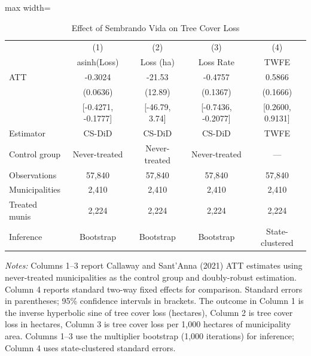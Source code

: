 \begin{table}[htbp]
\centering
\caption{Effect of Sembrando Vida on Tree Cover Loss}
\label{tab:main_results}
\begin{adjustbox}{max width=\textwidth}
\begin{tabular}{lcccc}
\toprule
 & (1) & (2) & (3) & (4) \\
 & asinh(Loss) & Loss (ha) & Loss Rate & TWFE \\
\midrule
ATT & -0.3024 & -21.53 & -0.4757 & 0.5866 \\
 & (0.0636) & (12.89) & (0.1367) & (0.1666) \\
 & [-0.4271, -0.1777] & [-46.79, 3.74] & [-0.7436, -0.2077] & [0.2600, 0.9131] \\
\midrule
Estimator & CS-DiD & CS-DiD & CS-DiD & TWFE \\
Control group & Never-treated & Never-treated & Never-treated & --- \\
Observations & 57,840 & 57,840 & 57,840 & 57,840 \\
Municipalities & 2,410 & 2,410 & 2,410 & 2,410 \\
Treated munis & 2,224 & 2,224 & 2,224 & 2,224 \\
Inference & Bootstrap & Bootstrap & Bootstrap & State-clustered \\
\bottomrule
\end{tabular}
\end{adjustbox}
\begin{tablenotes}[flushleft]
\small
\item \textit{Notes:} Columns 1--3 report Callaway and Sant'Anna (2021) ATT estimates using never-treated municipalities as the control group and doubly-robust estimation. Column 4 reports standard two-way fixed effects for comparison. Standard errors in parentheses; 95\% confidence intervals in brackets. The outcome in Column 1 is the inverse hyperbolic sine of tree cover loss (hectares), Column 2 is tree cover loss in hectares, Column 3 is tree cover loss per 1,000 hectares of municipality area. Columns 1--3 use the multiplier bootstrap (1,000 iterations) for inference; Column 4 uses state-clustered standard errors.
\end{tablenotes}
\end{table}
